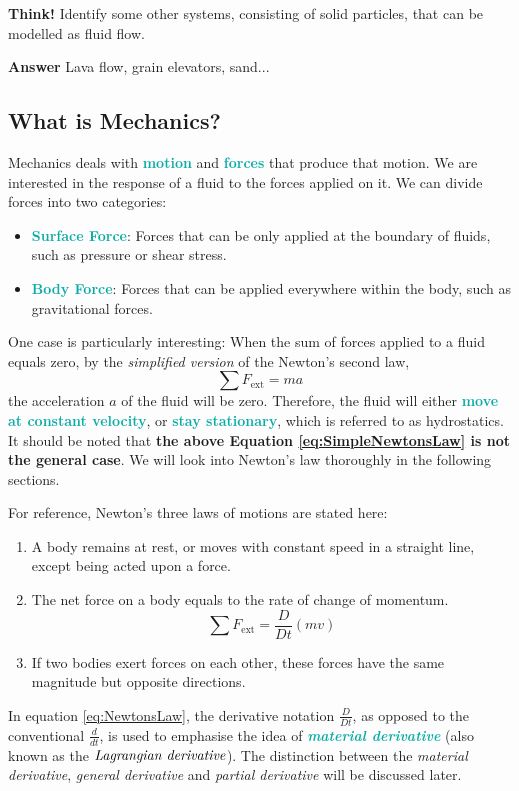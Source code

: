 \documentclass[twoside]{article}
\newcommand{\question}[1]{\begin{questionbox} \emoji{grapes} \textbf{Think!} \newline #1 \end{questionbox}}
\newcommand{\answer}[1]{\begin{answerbox} \emoji{melon} \textbf{Answer} \newline #1 \end{answerbox}}
\newcommand{\highlightbluetext}[1]{\textcolor[HTML]{09ACA6}{\textbf{#1}}}
\numberwithin{equation}{section}
\begin{document}
	\question{Identify some other systems, consisting of solid particles, that can be modelled as fluid flow.}
	
	\answer{Lava flow, grain elevators, sand...}
	
	
	\subsection{What is Mechanics?}
	\label{subsec:WhatIsMechanics}
	
	Mechanics deals with \highlightbluetext{motion} and \highlightbluetext{forces} that produce that motion. We are interested in the response of a fluid to the forces applied on it. We can divide forces into two categories:
	\begin{itemize}
		\item \highlightbluetext{Surface Force}: Forces that can be only applied at the boundary of fluids, such as pressure or shear stress.
		\item \highlightbluetext{Body Force}: Forces that can be applied everywhere within the body, such as gravitational forces.
	\end{itemize}
	One case is particularly interesting: When the sum of forces applied to a fluid equals zero, by the \emph{simplified version} of the Newton's second law,
	\begin{equation}
		\sum F_{\text{ext}} = ma
		\label{eq:SimpleNewtonsLaw}
	\end{equation}
	the acceleration $a$ of the fluid will be zero. Therefore, the fluid will either \highlightbluetext{move at constant velocity}, or \highlightbluetext{stay stationary}, which is referred to as hydrostatics. It should be noted that \textbf{the above Equation \ref{eq:SimpleNewtonsLaw} is not the general case}. We will look into Newton's law thoroughly in the following sections.
	
	For reference, Newton's three laws of motions are stated here:
	\begin{enumerate}
		\item A body remains at rest, or moves with constant speed in a straight line, except being acted upon a force.
		\item The net force on a body equals to the rate of change of momentum.
			  \begin{equation}
			  	\sum F_{\text{ext}} = \frac{D}{Dt} (mv)
			  	\label{eq:NewtonsLaw}
			  \end{equation}
		\item If two bodies exert forces on each other, these forces have the same magnitude but opposite directions.
	\end{enumerate}
	In equation \ref{eq:NewtonsLaw}, the derivative notation $\frac{D}{Dt}$, as opposed to the conventional $\frac{d}{dt}$, is used to emphasise the idea of \highlightbluetext{\emph{material derivative}} (also known as the $\emph{Lagrangian derivative}$). The distinction between the \emph{material derivative}, \emph{general derivative} and \emph{partial derivative} will be discussed later.
	
\end{document}
